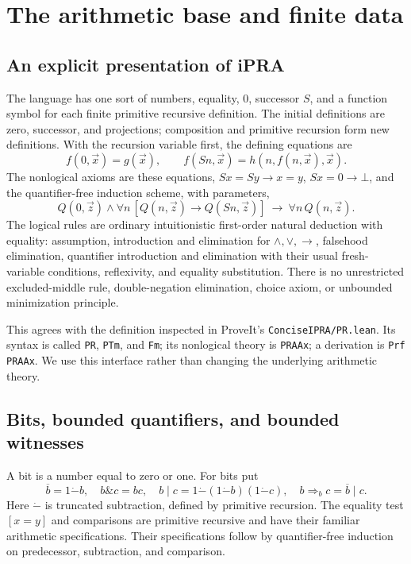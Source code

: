 \section{The arithmetic base and finite data}\label{sec:base}

\subsection{An explicit presentation of iPRA}

The language has one sort of numbers, equality, $0$, successor $S$, and a
function symbol for each finite primitive recursive definition. The initial
definitions are zero, successor, and projections; composition and primitive
recursion form new definitions. With the recursion variable first, the defining
equations are
\[
 f(0,\vec x)=g(\vec x),\qquad
 f(Sn,\vec x)=h(n,f(n,\vec x),\vec x).
\]
The nonlogical axioms are these equations, $Sx=Sy\to x=y$,
$Sx=0\to\bot$, and the quantifier-free induction scheme, with parameters,
\[
 Q(0,\vec z)\wedge\forall n\,[Q(n,\vec z)\to Q(Sn,\vec z)]
       \ \to\ \forall n\,Q(n,\vec z).
\]
The logical rules are ordinary intuitionistic first-order natural deduction
with equality: assumption, introduction and elimination for $\wedge,\vee,\to$,
falsehood elimination, quantifier introduction and elimination with their
usual fresh-variable conditions, reflexivity, and equality substitution.
There is no unrestricted excluded-middle rule, double-negation elimination,
choice axiom, or unbounded minimization principle.

This agrees with the definition inspected in ProveIt's
\texttt{ConciseIPRA/PR.lean}. Its syntax is called \texttt{PR},
\texttt{PTm}, and \texttt{Fm}; its nonlogical theory is \texttt{PRAAx}; a
derivation is \texttt{Prf PRAAx}. We use this interface rather than changing
the underlying arithmetic theory.

\subsection{Bits, bounded quantifiers, and bounded witnesses}

A bit is a number equal to zero or one. For bits put
\[
 \overline b=1\mathbin{\dot-}b,\quad b\mathbin{\&}c=bc,\quad
 b\mathbin{|}c=1\mathbin{\dot-}(1\mathbin{\dot-}b)(1\mathbin{\dot-}c),
 \quad b\Rightarrow_b c=\overline b\mathbin{|}c.
\]
Here $\dot-$ is truncated subtraction, defined by primitive recursion.
The equality test $[x=y]$ and comparisons are primitive recursive and have
their familiar arithmetic specifications. Their specifications follow by
quantifier-free induction on predecessor, subtraction, and comparison.

